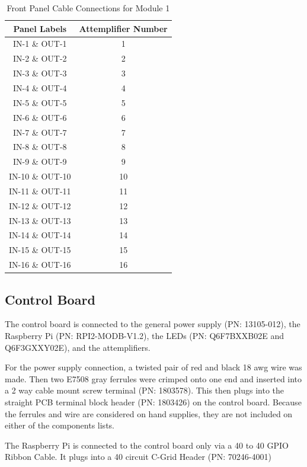 \documentclass[12pt,a4paper,oneside]{article}
\begin{document}
\begin{table}[H]
\centering
\caption{Front Panel Cable Connections for Module 1}
\begin{tabular}{@{}cc@{}}
\toprule
Panel Labels & Attemplifier Number\\ 
\midrule
IN-1 \& OUT-1 & 1\\
IN-2 \& OUT-2 & 2\\
IN-3 \& OUT-3 & 3\\
IN-4 \& OUT-4 & 4\\
IN-5 \& OUT-5 & 5\\
IN-6 \& OUT-6 & 6\\
IN-7 \& OUT-7 & 7\\
IN-8 \& OUT-8 & 8\\
IN-9 \& OUT-9 & 9\\
IN-10 \& OUT-10 & 10\\
IN-11 \& OUT-11 & 11\\
IN-12 \& OUT-12 & 12\\
IN-13 \& OUT-13 & 13\\
IN-14 \& OUT-14 & 14\\
IN-15 \& OUT-15 & 15\\
IN-16 \& OUT-16 & 16\\

\bottomrule            
\end{tabular}
\label{tab:Front_to_attemp}
\end{table}

\subsection{Control Board}
\label{sec:6.2}

The control board is connected to the general power supply (PN: 13105-012), the Raspberry Pi (PN: RPI2-MODB-V1.2), the LEDs (PN: Q6F7BXXB02E and Q6F3GXXY02E), and the attemplifiers.

For the power supply connection, a twisted pair of red and black 18 awg wire was made. Then two E7508 gray ferrules were crimped onto one end and inserted into a 2 way cable mount screw terminal (PN: 1803578). This then plugs into the straight PCB terminal block header (PN: 1803426) on the control board. Because the ferrules and wire are considered on hand supplies, they are not included on either of the components lists. 

The Raspberry Pi is connected to the control board only via a 40 to 40 GPIO Ribbon Cable. It plugs into a 40 circuit C-Grid Header (PN: 70246-4001)
\end{document}
